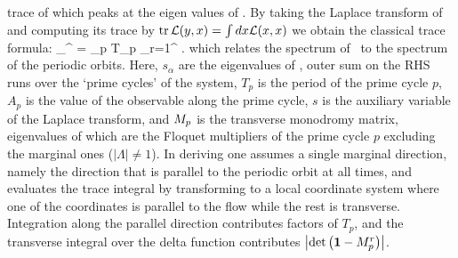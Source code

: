 \eeq
trace of which peaks at the eigen values of \Aop. By taking the
Laplace transform of  and computing its trace
by $\mbox{\rm tr}\, {\cal L} (y,x) = \int dx {\cal L} (x,x)$ we obtain the
classical trace formula:
\beq
\sum_{}^{\infty}  = \sum_p T_p
\sum_{r=1}^{\infty}  .
which relates the spectrum of \Aop\ to the spectrum of the periodic
orbits. Here, $s_{\alpha}$ are the eigenvalues of \Aop ,
outer sum on the RHS runs over the `prime cycles' of the system,
$T_p$ is the period of the prime cycle $p$, $A_p$ is the value of
the observable along the prime cycle, $s$ is the auxiliary
variable of the Laplace transform, and $M_p$ is the transverse
monodromy matrix, eigenvalues of which are the Floquet multipliers of the prime
cycle $p$ excluding the marginal ones ($|\Lambda| \neq 1$). In deriving
 one assumes a single marginal direction, namely
the direction that is parallel to the periodic orbit at all times, and evaluates
the trace integral by transforming to a local coordinate system where one of the
coordinates is parallel to the flow while the rest is transverse. Integration along
the parallel direction contributes factors of $T_p$, and the transverse integral
over the delta function contributes $\left|\mbox{\rm det}\,\!\left({\bf 1}-M_p^{r}\right)\right|$. 

